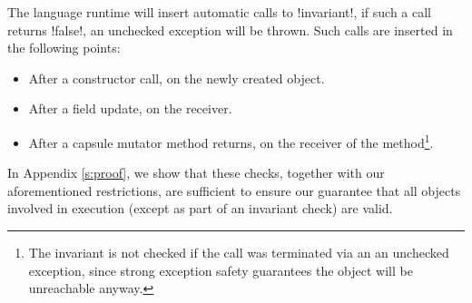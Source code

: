 The language runtime will insert automatic calls to \Q!invariant!, if such a call returns \Q!false!, an unchecked exception will be thrown. Such calls are inserted in the following points:
\begin{itemize}
	\item After a constructor call, on the newly created object.
	\item After a field update, on the receiver.
	\item After a capsule mutator method returns, on the receiver of the method\footnote{The invariant is not checked if the call was terminated via an an unchecked exception, since strong exception safety guarantees the object will be unreachable anyway.}.
\end{itemize}

\noindent In Appendix \ref{s:proof}, we show that these checks, together with our aforementioned restrictions, are sufficient to ensure our guarantee that all objects involved in execution (except as part of an invariant check) are valid.

